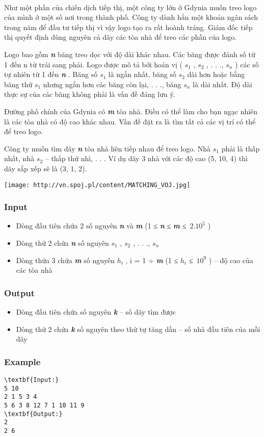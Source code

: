 

 

Như một phần của chiến dịch tiếp thị, một công ty lớn ở Gdynia muốn treo logo của mình ở một số nơi trong thành phố. Công ty dành hẳn một khoản ngân sách trong năm để đầu tư tiếp thị vì vậy logo tạo ra rất hoành tráng. Giám đốc tiếp thị quyết định dùng nguyên cả dãy các tòa nhà để treo các phần của logo.

Logo bao gồm \textbf{\emph{ n }} băng treo dọc với độ dài khác nhau. Các băng được đánh số từ 1 đến n từ trái sang phải. Logo được mô tả bởi hoán vị ( \textbf{\emph{ $s_{1}$}} , \textbf{\emph{ $s_{2}$}} , . . ., \textbf{\emph{ $s_{n}$}} ) các số tự nhiên từ 1 đến \textbf{\emph{ n }} . Băng số \textbf{\emph{ $s_{1}$}} là ngắn nhất, băng số \textbf{\emph{ $s_{2}$}} dài hơn hoặc bằng băng thứ \textbf{\emph{ $s_{1}$}} nhưng ngắn hơn các băng còn lại, . . ., băng \textbf{\emph{ $s_{n}$}} là dài nhất. Độ dài thực sự của các băng không phải là vấn đề đáng lưu ý.

Đường phố chính của Gdynia có \textbf{\emph{ m }} tòa nhà. Điều có thể làm cho bạn ngạc nhiên là các tòa nhà có độ cao khác nhau. Vấn đề đặt ra là tìm tất cả các vị trí có thể để treo logo.

Công ty muốn tìm dãy \textbf{\emph{ n }} tòa nhà liên tiếp nhau để treo logo. Nhà \textbf{\emph{ $s_{1}$}} phải là thấp nhất, nhà \textbf{\emph{ $s_{2}$}} – thấp thứ nhì, . . . Ví dụ dãy 3 nhà với các độ cao (5, 10, 4) thì dãy sắp xếp sẽ là (3, 1, 2).


\texttt{[image: http://vn.spoj.pl/content/MATCHING\_VOJ.jpg]}

\subsubsection{Input}
\begin{itemize}
	\item Dòng đầu tiên chứa 2 số nguyên \textbf{\emph{ n }} và \textbf{\emph{ m }} (1 ≤ \textbf{\emph{ n }} ≤ \textbf{\emph{ m }} ≤ 2.$10^{5}$ )
	\item Dòng thứ 2 chứa \textbf{\emph{ n }} số nguyên \textbf{\emph{ $s_{1}$}} , \textbf{\emph{ $s_{2}$}} , . . ., \textbf{\emph{ $s_{n}$}}
	\item Dòng thứa 3 chứa \textbf{\emph{ m }} số nguyên \textbf{\emph{ $h_{i}$}} , i = 1 ÷ \textbf{\emph{ m }} (1 ≤ \textbf{\emph{ $h_{i}$}} ≤ $10^{9}$ ) – độ cao của các tòa nhà
\end{itemize}

\subsubsection{Output}
\begin{itemize}
	\item Dòng đầu tiên chứa số nguyên \textbf{\emph{ k }} – số dãy tìm được
	\item Dòng thứ 2 chứa \textbf{\emph{ k }} số nguyên theo thứ tự tăng dần – số nhà đầu tiên của mỗi dãy
\end{itemize}

\subsubsection{Example}
\begin{verbatim}
\textbf{Input:}
5 10
2 1 5 3 4
5 6 3 8 12 7 1 10 11 9
\textbf{Output:}
2
2 6\end{verbatim}
